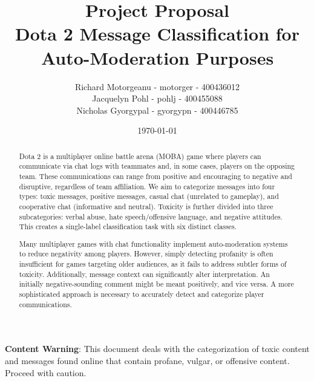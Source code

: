 \documentclass[11pt, letterpaper, notitlepage]{article}
\title{Project Proposal \\ Dota 2 Message Classification for Auto-Moderation Purposes}
\author{Richard Motorgeanu - motorger - 400436012\\ Jacquelyn Pohl - pohlj - 400455088\\ Nicholas Gyorgypal - gyorgypn - 400446785}
\date{\today}
\begin{document}
\maketitle


\vspace{1em}

\centering
\textbf{Content Warning}: This document deals with the categorization of toxic content and messages found online that contain profane, vulgar, or offensive content. Proceed with caution.

\vspace{2em}

\noindent
\begin{abstract}



    Dota 2 is a multiplayer online battle arena (MOBA) game where players can communicate via chat logs with teammates and, in some cases, players on the opposing team. These communications can range from positive and encouraging to negative and disruptive, regardless of team affiliation. We aim to categorize messages into four types: toxic messages, positive messages, casual chat (unrelated to gameplay), and cooperative chat (informative and neutral). Toxicity is further divided into three subcategories: verbal abuse, hate speech/offensive language, and negative attitudes. This creates a single-label classification task with six distinct classes.

    Many multiplayer games with chat functionality implement auto-moderation systems to reduce negativity among players. However, simply detecting profanity is often insufficient for games targeting older audiences, as it fails to address subtler forms of toxicity. Additionally, message context can significantly alter interpretation. An initially negative-sounding comment might be meant positively, and vice versa. A more sophisticated approach is necessary to accurately detect and categorize player communications.

\end{abstract}
\end{document}

